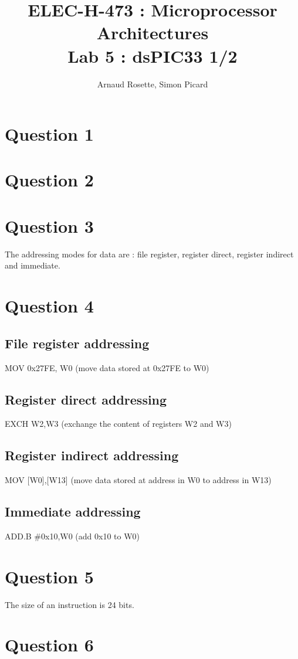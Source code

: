 \documentclass[a4paper,10pt]{article}
\title{ELEC-H-473 : Microprocessor Architectures\\ Lab 5 : dsPIC33 1/2}
\author{Arnaud Rosette, Simon Picard}
\begin{document}
\maketitle
\section*{Question 1}

\section*{Question 2}

\section*{Question 3}
The addressing modes for data are : file register, register direct, register indirect and immediate.

\section*{Question 4}
\subsection*{File register addressing}
MOV 0x27FE, W0 (move data stored at 0x27FE to W0)
\subsection*{Register direct addressing}
EXCH W2,W3 (exchange the content of registers W2 and W3)
\subsection*{Register indirect addressing}
MOV [W0],[W13] (move data stored at address in W0 to address in W13)
\subsection*{Immediate addressing}
ADD.B $\#$0x10,W0 (add 0x10 to W0)

\section*{Question 5}
The size of an instruction is 24 bits. %

\section*{Question 6}
\end{document}
